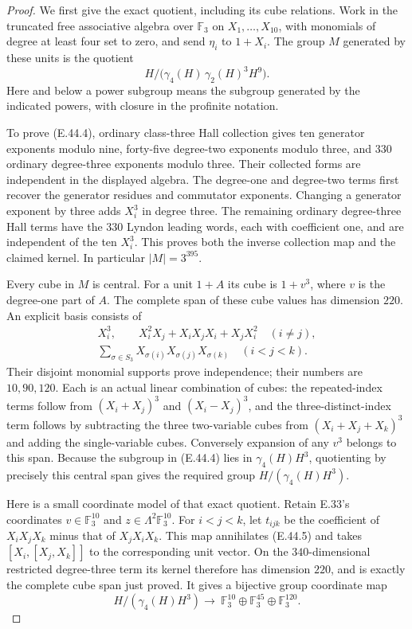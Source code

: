 \begin{proof}
We first give the exact quotient, including its cube
relations.  Work in the truncated free associative
algebra over $\mathbb F_3$ on $X_1,\ldots,X_{10}$,
with monomials of degree at least four set to zero,
and send $\eta_i$ to $1+X_i$.
The group $M$ generated by these units is the quotient
\[
 H/\bigl(\gamma_4(H)\,\gamma_2(H)^3 H^9\bigr).
 \tag{E.44.4}
\]
Here and below a power subgroup means the subgroup
generated by the indicated powers, with closure in
the profinite notation.

To prove \textup{(E.44.4)}, ordinary class-three Hall
collection gives ten generator exponents modulo nine,
forty-five degree-two exponents modulo three, and
$330$ ordinary degree-three exponents modulo three.
Their collected forms are independent in the displayed
algebra.  The degree-one and degree-two terms first
recover the generator residues and commutator
exponents.  Changing a generator exponent by three
adds $X_i^3$ in degree three.  The remaining ordinary
degree-three Hall terms have the $330$ Lyndon leading
words, each with coefficient one, and are independent
of the ten $X_i^3$.  This proves both the inverse
collection map and the claimed kernel.
In particular $|M|=3^{395}$.

Every cube in $M$ is central.  For a unit $1+A$ its
cube is $1+v^3$, where $v$ is the degree-one part of
$A$.  The complete span of these cube values has
dimension $220$.  An explicit basis consists of
\[
 \begin{gathered}
 X_i^3,\qquad
 X_i^2X_j+X_iX_jX_i+X_jX_i^2\quad(i\ne j),\\
 \sum_{\sigma\in S_3}
       X_{\sigma(i)}X_{\sigma(j)}X_{\sigma(k)}
                           \quad(i<j<k).
 \end{gathered}
 \tag{E.44.5}
\]
Their disjoint monomial supports prove independence;
their numbers are $10,90,120$.
Each is an actual linear combination of cubes:
the repeated-index terms follow from
$(X_i+X_j)^3$ and $(X_i-X_j)^3$, and the
three-distinct-index term follows by subtracting
the three two-variable cubes from
$(X_i+X_j+X_k)^3$ and adding the single-variable cubes.
Conversely expansion of any $v^3$ belongs to this span.
Because the subgroup in \textup{(E.44.4)} lies in
$\gamma_4(H)H^3$, quotienting by precisely this central
span gives the required group
$H/(\gamma_4(H)H^3)$.

Here is a small coordinate model of that exact
quotient.  Retain E.33's coordinates
$v\in\mathbb F_3^{10}$ and
$z\in\Lambda^2\mathbb F_3^{10}$.
For $i<j<k$, let $t_{ijk}$ be the coefficient of
$X_iX_jX_k$ minus that of $X_jX_iX_k$.
This map annihilates \textup{(E.44.5)} and takes
$[X_i,[X_j,X_k]]$ to the corresponding unit vector.
On the $340$-dimensional restricted degree-three
term its kernel therefore has dimension $220$,
and is exactly the complete cube span just proved.
It gives a bijective group coordinate map
\[
 H/(\gamma_4(H)H^3) \longrightarrow\
 \mathbb F_3^{10}\oplus\mathbb F_3^{45}
                         \oplus\mathbb F_3^{120}.
 \tag{E.44.6}
\]


\end{proof}

